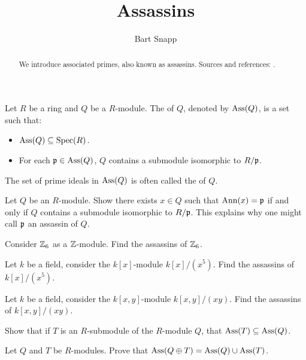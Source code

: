 \documentclass{ximera}
\author{Bart Snapp}
\title{Assassins}
\begin{document}
\begin{abstract}
  We introduce associated primes, also known as assassins. Sources and
  references: \cite{sD2008, dE1995, mR1995,jpS2000}.
\end{abstract}
\maketitle

\begin{definition}
  Let $R$ be a ring and $Q$ be a $R$-module. The  of
  $Q$, denoted by $\operatorname{Ass}(Q)$, is a set such that:
  \begin{itemize}
  \item $\operatorname{Ass}(Q)\subseteq\operatorname{Spec}(R)$.
  \item For each $\mathfrak{p}\in\operatorname{Ass}(Q)$, $Q$ contains a submodule isomorphic
    to $R/\mathfrak{p}$.
  \end{itemize}
  The set of prime ideals in $\operatorname{Ass}(Q)$ is often called the
   of $Q$.
\end{definition}

\begin{exercise}
  Let $Q$ be an $R$-module. Show there exists $x\in Q$ such that
  $\operatorname{Ann}(x) = \mathfrak{p}$ if and only if $Q$ contains a submodule isomorphic to
  $R/\mathfrak{p}$. This explains why one might call $\mathfrak{p}$ an assassin of $Q$.
\end{exercise}

\begin{exercise}
  Consider $\mathbb Z_6$ as a $\mathbb Z$-module. Find the assassins of $\mathbb Z_6$.
\end{exercise}

\begin{exercise}
  Let $k$ be a field, consider the $k[x]$-module $k[x]/(x^5)$. Find
  the assassins of $k[x]/(x^5)$.
\end{exercise}

\begin{exercise}
  Let $k$ be a field, consider the $k[x,y]$-module $k[x,y]/(xy)$. Find
  the assassins of $k[x,y]/(xy)$.
\end{exercise}

\begin{exercise}
  Show that if $T$ is an $R$-submodule of the $R$-module $Q$, that
  $\operatorname{Ass}(T) \subseteq \operatorname{Ass}(Q)$.
\end{exercise}


\begin{exercise}
  Let $Q$ and $T$ be $R$-modules. Prove that $\operatorname{Ass}(Q\oplus T) = \operatorname{Ass}(Q)\cup\operatorname{Ass}(T)$.
\end{exercise}
\end{document}
